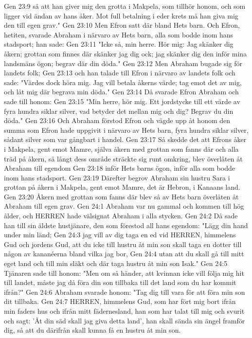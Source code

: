 Gen 23:9  så att han giver mig den grotta i Makpela, som tillhör honom, och som ligger vid ändan av hans åker. Mot full betalning i eder krets må han giva mig den till egen grav."
Gen 23:10  Men Efron satt där bland Hets barn. Och Efron, hetiten, svarade Abraham i närvaro av Hets barn, alla som bodde inom hans stadsport; han sade:
Gen 23:11  "Icke så, min herre. Hör mig: Jag skänker dig åkern; grottan som finnes där skänker jag dig ock; jag skänker dig den inför mina landsmäns ögon; begrav där din döda."
Gen 23:12  Men Abraham bugade sig för landets folk;
Gen 23:13  och han talade till Efron i närvaro av landets folk och sade: "Värdes dock höra mig. Jag vill betala åkerns värde; tag emot det av mig, och låt mig där begrava min döda."
Gen 23:14  Då svarade Efron Abraham och sade till honom:
Gen 23:15  "Min herre, hör mig. Ett jordstycke till ett värde av fyra hundra siklar silver, vad betyder det mellan mig och dig? Begrav du din döda."
Gen 23:16  Och Abraham förstod Efron och vägde upp åt honom den summa som Efron hade uppgivit i närvaro av Hets barn, fyra hundra siklar silver, sådant silver som var gångbart i handel.
Gen 23:17  Så skedde det att Efrons åker i Makpela, gent emot Mamre, själva åkern med grottan som fanns där och alla träd på åkern, så långt dess område sträckte sig runt omkring, blev överlåten åt Abraham till egendom
Gen 23:18  inför Hets barns ögon, inför alla som bodde inom hans stadsport.
Gen 23:19  Därefter begrov Abraham sin hustru Sara i grottan på åkern i Makpela, gent emot Mamre, det är Hebron, i Kanaans land.
Gen 23:20  Åkern med grottan som fanns där blev så av Hets barn överlåten åt Abraham till egen grav.
Gen 24:1  Abraham var nu gammal och kommen till hög ålder, och HERREN hade välsignat Abraham i alla stycken.
Gen 24:2  Då sade han till sin äldste hustjänare, den som förestod all hans egendom: "Lägg din hand under min länd;
Gen 24:3  jag vill av dig taga en ed vid HERREN, himmelens Gud och jordens Gud, att du icke till hustru åt min son skall taga en dotter till någon av kananéerna bland vilka jag bor,
Gen 24:4  utan att du skall gå till mitt eget land och till min släkt och där taga hustru åt min son Isak."
Gen 24:5  Tjänaren sade till honom: "Men om så händer, att kvinnan icke vill följa mig hit till landet, måste jag då föra din son tillbaka till det land som du har kommit ifrån?"
Gen 24:6  Abraham svarade honom: "Tag dig till vara för att föra min son dit tillbaka.
Gen 24:7  HERREN, himmelens Gud, som har fört mig bort ifrån min faders hus och ifrån mitt fädernesland, han som har talat till mig och svurit och sagt: 'Åt din säd skall jag giva detta land', han skall sända sin ängel framför dig, så att du därifrån skall kunna få en hustru åt min son.
